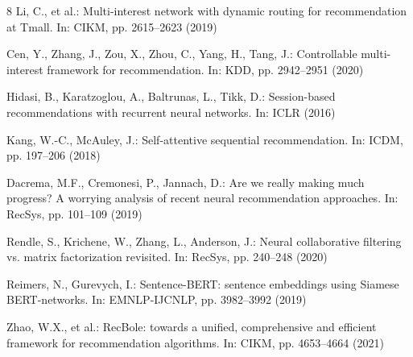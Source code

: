 \documentclass[runningheads]{llncs}
\begin{document}
\begin{thebibliography}{8}
\setlength{\itemsep}{0pt plus 0.2pt}
Li, C., et al.: Multi-interest network with dynamic routing for recommendation at Tmall.
In: CIKM, pp. 2615--2623 (2019)

Cen, Y., Zhang, J., Zou, X., Zhou, C., Yang, H., Tang, J.: Controllable multi-interest
framework for recommendation. In: KDD, pp. 2942--2951 (2020)

Hidasi, B., Karatzoglou, A., Baltrunas, L., Tikk, D.: Session-based recommendations with
recurrent neural networks. In: ICLR (2016)

Kang, W.-C., McAuley, J.: Self-attentive sequential recommendation. In: ICDM,
pp. 197--206 (2018)

Dacrema, M.F., Cremonesi, P., Jannach, D.: Are we really making much progress? A worrying
analysis of recent neural recommendation approaches. In: RecSys, pp. 101--109 (2019)

Rendle, S., Krichene, W., Zhang, L., Anderson, J.: Neural collaborative filtering vs.
matrix factorization revisited. In: RecSys, pp. 240--248 (2020)

Reimers, N., Gurevych, I.: Sentence-BERT: sentence embeddings using Siamese BERT-networks.
In: EMNLP-IJCNLP, pp. 3982--3992 (2019)

Zhao, W.X., et al.: RecBole: towards a unified, comprehensive and efficient framework for
recommendation algorithms. In: CIKM, pp. 4653--4664 (2021)
\end{thebibliography}
\end{document}
